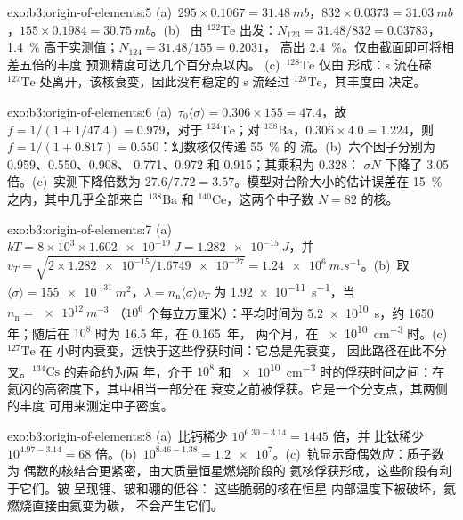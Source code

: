 \begin{solution}{exo:b3:origin-of-elements:5}
(a)~$295\times0.1067 = \qty{31.48}{mb}$，$832\times0.0373 =
\qty{31.03}{mb}$，$155\times0.1984 = \qty{30.75}{mb}$。(b)~
由 $^{122}\mathrm{Te}$ 出发：$N_{123} = 31.48/832 = \num{0.03783}$，\qty{1.4}{\percent}
高于实测值；$N_{124} = 31.48/155 = \num{0.2031}$，
高出 \qty{2.4}{\percent}。仅由截面即可将相差五倍的丰度
预测精度可达几个百分点以内。
(c)~$^{128}\mathrm{Te}$ 仅由 形成：s 流在碲
$^{127}\mathrm{Te}$ 处离开，该核衰变，因此没有稳定的 s 流经过
$^{128}\mathrm{Te}$，其丰度由 决定。
\end{solution}

\begin{solution}{exo:b3:origin-of-elements:6}
(a)~$\tau_0\langle\sigma\rangle = 0.306\times155 = 47.4$，故
$f = 1/(1 + 1/47.4) = \num{0.979}$，对于 $^{124}\mathrm{Te}$；对
$^{138}\mathrm{Ba}$，$0.306\times4.0 = 1.224$，则 $f = 1/(1 + 0.817) =
\num{0.550}$：幻数核仅传递 \qty{55}{\percent} 的
流。(b)~六个因子分别为 \num{0.959}、\num{0.550}、\num{0.908}、
\num{0.771}、\num{0.972} 和 \num{0.915}；其乘积为 \num{0.328}：
$\sigma N$ 下降了 \num{3.05} 倍。(c)~实测下降倍数为
$27.6/7.72 = 3.57$。模型对台阶大小的估计误差在
\qty{15}{\percent} 之内，其中几乎全部来自 $^{138}\mathrm{Ba}$ 和
$^{140}\mathrm{Ce}$，这两个中子数 $N = 82$ 的核。
\end{solution}

\begin{solution}{exo:b3:origin-of-elements:7}
(a)~$kT = 8\times10^3\times\qty{1.602e-19}{J} = \qty{1.282e-15}{J}$，并
$v_T = \sqrt{2\times\num{1.282e-15}/\num{1.6749e-27}} =
\qty{1.24e6}{m.s^{-1}}$。(b)~取 $\langle\sigma\rangle =
\qty{155e-31}{m^2}$，$\lambda = n_\mathrm{n}\langle\sigma\rangle v_T$ 为
\qty{1.92e-11}{s^{-1}}，当 $n_\mathrm{n} = \qty{e12}{m^{-3}}$
（$10^6$ 个每立方厘米）：平均时间为 \qty{5.2e10}{s}，约
\num{1650} 年；随后在 $10^8$ 时为 \num{16.5} 年，在 \num{0.165}~年，
两个月，在 \qty{e10}{cm^{-3}} 时。(c)~$^{127}\mathrm{Te}$ 在
小时内衰变，远快于这些俘获时间：它总是先衰变，
因此路径在此不分叉。$^{134}\mathrm{Cs}$ 的寿命约为两
年，介于 $10^8$ 和 \qty{e10}{cm^{-3}} 时的俘获时间之间：在
氦闪的高密度下，其中相当一部分在
衰变之前被俘获。它是一个分支点，其两侧的丰度
可用来测定中子密度。
\end{solution}

\begin{solution}{exo:b3:origin-of-elements:8}
(a)~比钙稀少 $10^{6.30 - 3.14} = 1445$ 倍，并
比钛稀少 $10^{4.97 - 3.14} = 68$ 倍。(b)~$10^{8.46 - 1.38}
= \num{1.2e7}$。(c)~钪显示奇偶效应：质子数为
偶数的核结合更紧密，由大质量恒星燃烧阶段的
氦核俘获形成，这些阶段有利于它们。铍
呈现锂、铍和硼的低谷：
这些脆弱的核在恒星
内部温度下被破坏，氦燃烧直接由氦变为碳，
不会产生它们。
\end{solution}

